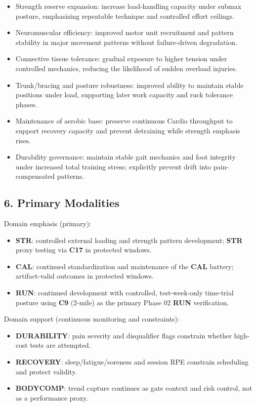 \documentclass[10pt]{article}
\begin{document}
\begin{itemize}
\item Strength reserve expansion: increase load-handling capacity under submax posture, emphasizing repeatable technique and controlled effort ceilings.
\item Neuromuscular efficiency: improved motor unit recruitment and pattern stability in major movement patterns without failure-driven degradation.
\item Connective tissue tolerance: gradual exposure to higher tension under controlled mechanics, reducing the likelihood of sudden overload injuries.
\item Trunk/bracing and posture robustness: improved ability to maintain stable positions under load, supporting later work capacity and ruck tolerance phases.
\item Maintenance of aerobic base: preserve continuous Cardio throughput to support recovery capacity and prevent detraining while strength emphasis rises.
\item Durability governance: maintain stable gait mechanics and foot integrity under increased total training stress; explicitly prevent drift into pain-compensated patterns.
\end{itemize}

\subsection*{6. Primary Modalities}

Domain emphasis (primary):

\begin{itemize}
\item \textbf{STR}: controlled external loading and strength pattern development; \textbf{STR} proxy testing via \textbf{C17} in protected windows.
\item \textbf{CAL}: continued standardization and maintenance of the \textbf{CAL} battery; artifact-valid outcomes in protected windows.
\item \textbf{RUN}: continued development with controlled, test-week-only time-trial posture using \textbf{C9} (2-mile) as the primary Phase 02 \textbf{RUN} verification.
\end{itemize}

Domain support (continuous monitoring and constraints):

\begin{itemize}
\item \textbf{DURABILITY}: pain severity and disqualifier flags constrain whether high-cost tests are attempted.
\item \textbf{RECOVERY}: sleep/fatigue/soreness and session RPE constrain scheduling and protect validity.
\item \textbf{BODYCOMP}: trend capture continues as gate context and risk control, not as a performance proxy.
\end{itemize}
\end{document}
